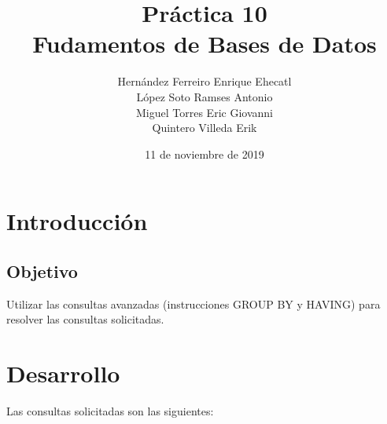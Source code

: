 \documentclass[12pt, letterpaper]{article}
\author{Hernández Ferreiro Enrique Ehecatl \\
        López Soto Ramses Antonio \\
        Miguel Torres Eric Giovanni \\
        Quintero Villeda Erik}
\title{Práctica 10 \\
       {\small Fudamentos de Bases de Datos}}
\date{11 de noviembre de 2019}
\begin{document}
    \maketitle

    \section*{Introducción} 

        \subsection*{Objetivo}
        Utilizar las consultas avanzadas (instrucciones GROUP BY y HAVING) para resolver las consultas solicitadas.
    
    \section*{Desarrollo}
    Las consultas solicitadas son las siguientes:
\end{document}
